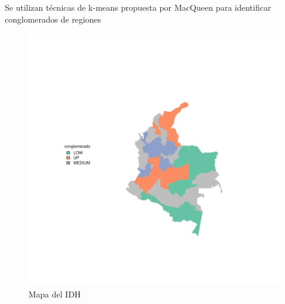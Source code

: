 \documentclass{article}
\begin{document}
Se utilizan técnicas de k-means propuesta por MacQueen \cite{macqueen_methods_nodate} para identificar conglomerados de regiones

\begin{figure}[h]
\centering
\includegraphics{ProyectoFinal-MapPaint}
\caption{Mapa del IDH}
\label{map}
\end{figure}


\renewcommand{\refname}{Bibliografía}

\end{document}
